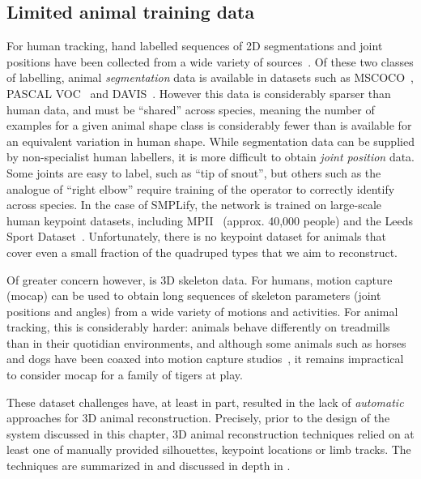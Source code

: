 \subsection{Limited animal training data}
    For human tracking, hand labelled sequences of 2D segmentations and joint positions have been collected from a wide variety of sources~\cite{andriluka14cvpr,lin2014microsoft,johnson2010clustered}. Of these two classes of labelling, animal {\em segmentation} data is available in datasets such as MSCOCO~\cite{lin2014microsoft}, PASCAL VOC~\cite{everingham2010pascal} and DAVIS~\cite{Perazzi2016}.  However this data is considerably sparser than human data, and must be ``shared'' across species, meaning the number of examples for a given animal shape class is considerably fewer than is available for an equivalent variation in human shape.  While segmentation data can be supplied by non-specialist human labellers, it is more difficult to obtain {\em joint position} data.  Some joints are easy to label, such as ``tip of snout'', but others such as the analogue of ``right elbow'' require training of the operator to correctly identify across species. In the case of SMPLify, the network is trained on large-scale human keypoint datasets, including MPII~\cite{andriluka14cvpr} (approx. 40,000 people) and the Leeds Sport Dataset~\cite{johnson2010clustered}. Unfortunately, there is no keypoint dataset for animals that cover even a small fraction of the quadruped types that we aim to reconstruct. 

    Of greater concern however, is 3D skeleton data.  For humans, motion capture (mocap) can be used to obtain long sequences of skeleton parameters (joint positions and angles) from a wide variety of motions and activities. For animal tracking, this is considerably harder: animals behave differently on treadmills than in their quotidian environments, and although some animals such as horses and dogs have been coaxed into motion capture studios~\cite{wilhelm2015furyexplorer}, it remains impractical to consider mocap for a family of tigers at play.

    These dataset challenges have, at least in part, resulted in the lack of \emph{automatic} approaches for 3D animal reconstruction. Precisely, prior to the design of the system discussed in this chapter, 3D animal reconstruction techniques relied on at least one of manually provided silhouettes, keypoint locations or limb tracks. The techniques are summarized in  and discussed in depth in . 

